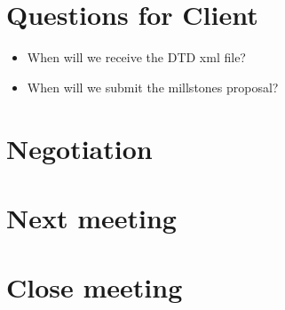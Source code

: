 \documentclass[11pt, a4paper]{article}
\begin{document}
\section{Questions for Client}
\begin{itemize}
	\item When will we receive the DTD xml file?
	\item When will we submit the millstones proposal?
\end{itemize}
\section{Negotiation}


\section{Next meeting}

\section {Close meeting}
\vspace*{10pt}
\end{document}
